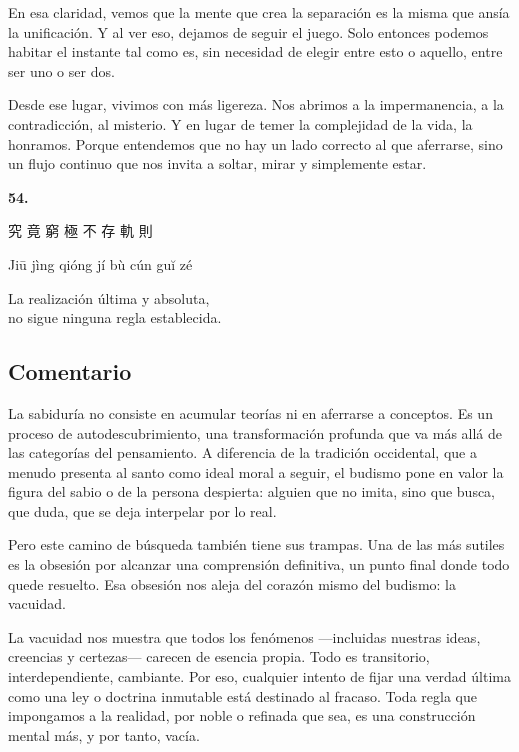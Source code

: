 \documentclass[
  a5paperpaper,
]{article}
\begin{document}
En esa claridad, vemos que la mente que crea la separación es la misma
que ansía la unificación. Y al ver eso, dejamos de seguir el juego. Solo
entonces podemos habitar el instante tal como es, sin necesidad de
elegir entre esto o aquello, entre ser uno o ser dos.

Desde ese lugar, vivimos con más ligereza. Nos abrimos a la
impermanencia, a la contradicción, al misterio. Y en lugar de temer la
complejidad de la vida, la honramos. Porque entendemos que no hay un
lado correcto al que aferrarse, sino un flujo continuo que nos invita a
soltar, mirar y simplemente estar.

\hfill\break

\hypertarget{04}{}
\begin{verseblock}

\newpage

\begin{center}\textbf{54.}\end{center}

究 竟 窮 極 不 存 軌 則

Jiū jìng qióng jí bù cún guĭ zé

La realización última y absoluta,\\
no sigue ninguna regla establecida.

\end{verseblock}

\hfill\break

\hypertarget{comentario-53}{%
\subsection{Comentario}\label{comentario-53}}

La sabiduría no consiste en acumular teorías ni en aferrarse a
conceptos. Es un proceso de autodescubrimiento, una transformación
profunda que va más allá de las categorías del pensamiento. A diferencia
de la tradición occidental, que a menudo presenta al santo como ideal
moral a seguir, el budismo pone en valor la figura del sabio o de la
persona despierta: alguien que no imita, sino que busca, que duda, que
se deja interpelar por lo real.

Pero este camino de búsqueda también tiene sus trampas. Una de las más
sutiles es la obsesión por alcanzar una comprensión definitiva, un punto
final donde todo quede resuelto. Esa obsesión nos aleja del corazón
mismo del budismo: la vacuidad.

La vacuidad nos muestra que todos los fenómenos ---incluidas nuestras
ideas, creencias y certezas--- carecen de esencia propia. Todo es
transitorio, interdependiente, cambiante. Por eso, cualquier intento de
fijar una verdad última como una ley o doctrina inmutable está destinado
al fracaso. Toda regla que impongamos a la realidad, por noble o
refinada que sea, es una construcción mental más, y por tanto, vacía.
\end{document}
